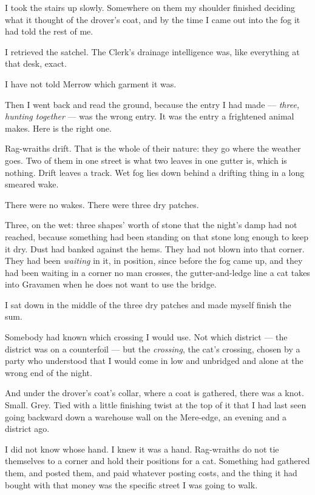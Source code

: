I took the stairs up slowly. Somewhere on them my shoulder finished deciding what it thought of the drover's coat, and by the time I came out into the fog it had told the rest of me.

\scenebreak

I retrieved the satchel. The Clerk's drainage intelligence was, like everything at that desk, exact.

I have not told Merrow which garment it was.

Then I went back and read the ground, because the entry I had made --- \emph{three, hunting together} --- was the wrong entry. It was the entry a frightened animal makes. Here is the right one.

Rag-wraiths drift. That is the whole of their nature: they go where the weather goes. Two of them in one street is what two leaves in one gutter is, which is nothing. Drift leaves a track. Wet fog lies down behind a drifting thing in a long smeared wake.

There were no wakes. There were three dry patches.

Three, on the wet: three shapes' worth of stone that the night's damp had not reached, because something had been standing on that stone long enough to keep it dry. Dust had banked against the hems. They had not blown into that corner. They had been \emph{waiting} in it, in position, since before the fog came up, and they had been waiting in a corner no man crosses, the gutter-and-ledge line a cat takes into Gravamen when he does not want to use the bridge.

I sat down in the middle of the three dry patches and made myself finish the sum.

Somebody had known which crossing I would use. Not which district --- the district was on a counterfoil --- but the \emph{crossing}, the cat's crossing, chosen by a party who understood that I would come in low and unbridged and alone at the wrong end of the night.

And under the drover's coat's collar, where a coat is gathered, there was a knot. Small. Grey. Tied with a little finishing twist at the top of it that I had last seen going backward down a warehouse wall on the Mere-edge, an evening and a district ago.

I did not know whose hand. I knew it was a hand. Rag-wraiths do not tie themselves to a corner and hold their positions for a cat. Something had gathered them, and posted them, and paid whatever posting costs, and the thing it had bought with that money was the specific street I was going to walk.

